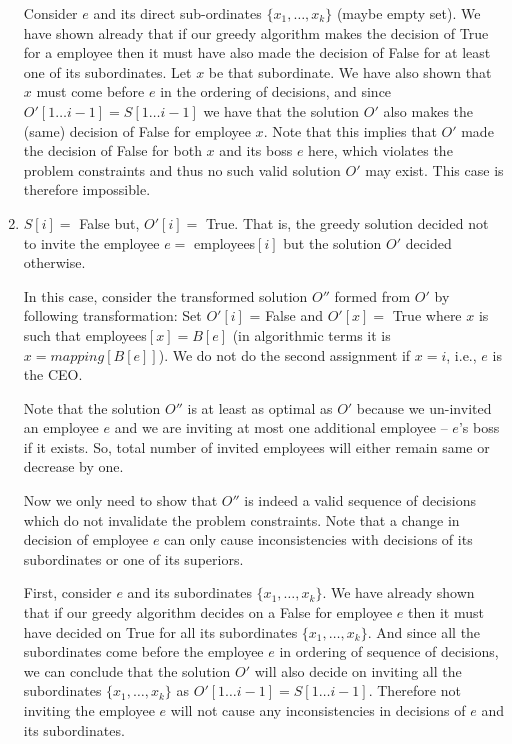 \documentclass[answers]{exam}
\begin{document}
\begin{questions}
\begin{solution}
\begin{enumerate}
    Consider $e$ and its direct sub-ordinates $\{x_1, \ldots, x_k\}$ (maybe empty set). We have shown already that if our greedy algorithm makes the decision of True for a employee then it must have also made the decision of False for at least one of its subordinates. Let $x$ be that subordinate. We have also shown that $x$ must come before $e$ in the ordering of decisions, and since $O'[1 \ldots i-1] = S[1 \ldots i-1]$ we have that the solution $O'$ also makes the (same) decision of False for employee $x$. Note that this implies that $O'$ made the decision of False for both $x$ and its boss $e$ here, which violates the problem constraints and thus no such valid solution $O'$ may exist. This case is therefore impossible.
    
    \item $S[i] =$ False but, $O'[i] =$ True. That is, the greedy solution decided not to invite the employee $e=$ employees$[i]$ but the solution $O'$ decided otherwise.
    
    In this case, consider the transformed solution $O''$ formed from $O'$ by following transformation: Set $O'[i]$ = False and $O'[x] =$ True where $x$ is such that employees$[x]=B[e]$ (in algorithmic terms it is $x = mapping[B[e]]$). We do not do the second assignment if $x = i$, i.e., $e$ is the CEO.
    
    Note that the solution $O''$ is at least as optimal as $O'$ because we un-invited an employee $e$ and we are inviting at most one additional employee -- $e$'s boss if it exists. So, total number of invited employees will either remain same or decrease by one.
    
    Now we only need to show that $O''$ is indeed a valid sequence of decisions which do not invalidate the problem constraints. Note that a change in decision of employee $e$ can only cause inconsistencies with decisions of its subordinates or one of its superiors.
    
    First, consider $e$ and its subordinates $\{x_1, \ldots, x_k\}$. We have already shown that if our greedy algorithm decides on a False for employee $e$ then it must have decided on True for all its subordinates $\{x_1, \ldots, x_k\}$. And since all the subordinates come before the employee $e$ in ordering of sequence of decisions, we can conclude that the solution $O'$ will also decide on inviting all the subordinates $\{x_1, \ldots, x_k\}$ as $O'[1 \ldots i-1] = S[1 \ldots i-1]$. Therefore not inviting the employee $e$ will not cause any inconsistencies in decisions of $e$ and its subordinates.
    

\end{enumerate}
\end{solution}
\end{questions}
\end{document}
